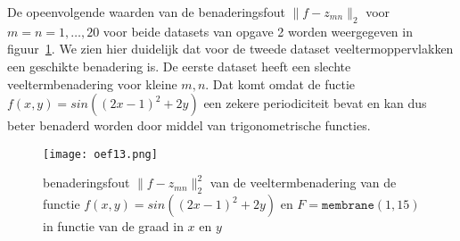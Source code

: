 De opeenvolgende waarden van de benaderingsfout $\lVert f-z_{mn} \rVert_2$ voor $m = n = 1,\dots,20$ voor beide datasets van opgave 2 worden weergegeven in figuur~\ref{fig:oef13}. We zien hier duidelijk dat voor de tweede dataset veeltermoppervlakken een geschikte benadering is. De eerste dataset heeft een slechte veeltermbenadering voor kleine $m,n$. Dat komt omdat de fuctie $f(x,y)=sin((2x-1)^2+2y)$ een zekere periodiciteit bevat en kan dus beter benaderd worden door middel van trigonometrische functies.

\begin{figure}[htb]
    \centering
    \texttt{[image: oef13.png]}
    \caption{benaderingsfout $\lVert f-z_{mn} \rVert_2^2$ van de veeltermbenadering van de functie $f(x,y)=sin((2x-1)^2+2y)$ en $F=\texttt{membrane}(1,15)$ in functie van de graad in $x$ en $y$}
    \label{fig:oef13}
\end{figure}
